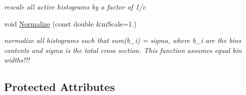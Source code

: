 \begin{DoxyCompactItemize}
\begin{DoxyCompactList}\small\item\em rescale all active histograms by a factor of 1/c \end{DoxyCompactList}\item 
void \hyperlink{classHistArray_a1a5eb9be28921e67bf3612e5b82954df}{Normalize} (const double \&m\-Scale=1.)
\begin{DoxyCompactList}\small\item\em normalize all histograms such that sum(b\-\_\-i) = sigma, where b\-\_\-i are the bins contents and sigma is the total cross section. This function assumes equal bin widths!!! \end{DoxyCompactList}\end{DoxyCompactItemize}
\subsection*{Protected Attributes}

